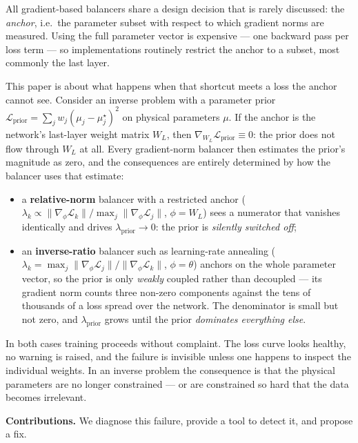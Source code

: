 \documentclass[a4paper,fleqn]{cas-sc}
\begin{document}
All gradient-based balancers share a design decision that is rarely discussed:
the \emph{anchor}, i.e.\ the parameter subset with respect to which gradient
norms are measured. Using the full parameter vector is expensive --- one
backward pass per loss term --- so implementations routinely restrict the
anchor to a subset, most commonly the last layer.

This paper is about what happens when that shortcut meets a loss the anchor
cannot see. Consider an inverse problem with a parameter prior
$\mathcal{L}_{\text{prior}} = \sum_j w_j(\mu_j - \mu_j^\star)^2$ on physical
parameters $\mu$. If the anchor is the network's last-layer weight matrix
$W_L$, then $\nabla_{W_L}\mathcal{L}_{\text{prior}} \equiv 0$: the prior does
not flow through $W_L$ at all. Every gradient-norm balancer then estimates the
prior's magnitude as zero, and the consequences are entirely determined by how
the balancer uses that estimate:

\begin{itemize}
\item a \textbf{relative-norm} balancer with a restricted anchor
($\lambda_k \propto \lVert\nabla_\phi \mathcal{L}_k\rVert /
\max_j \lVert\nabla_\phi \mathcal{L}_j\rVert$, $\phi = W_L$) sees a numerator
that vanishes identically and drives $\lambda_{\text{prior}} \to 0$: the prior
is \emph{silently switched off};
\item an \textbf{inverse-ratio} balancer such as learning-rate annealing
($\lambda_k = \max_j\lVert\nabla_\phi \mathcal{L}_j\rVert /
\lVert\nabla_\phi \mathcal{L}_k\rVert$, $\phi = \theta$) anchors on the whole
parameter vector, so the prior is only \emph{weakly} coupled rather than
decoupled --- its gradient norm counts three non-zero components against the
tens of thousands of a loss spread over the network. The denominator is small
but not zero, and $\lambda_{\text{prior}}$ grows until the prior
\emph{dominates everything else}.
\end{itemize}

In both cases training proceeds without complaint. The loss curve looks
healthy, no warning is raised, and the failure is invisible unless one happens
to inspect the individual weights. In an inverse problem the consequence is
that the physical parameters are no longer constrained --- or are constrained
so hard that the data becomes irrelevant.

\textbf{Contributions.} We diagnose this failure, provide a tool to detect it,
and propose a fix.
\end{document}
